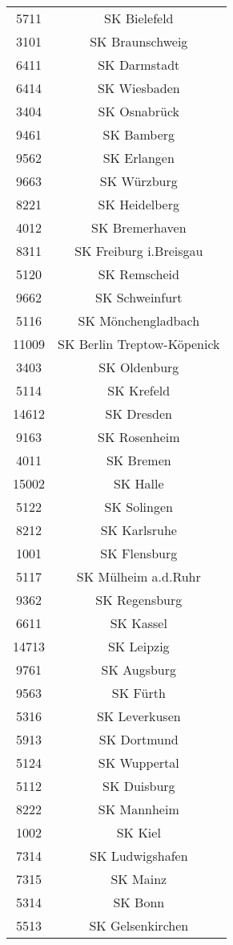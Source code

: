 \begin{tabular}{c c}
    5711&SK Bielefeld\\ 
    3101&SK Braunschweig\\ 
    6411&SK Darmstadt\\ 
    6414&SK Wiesbaden\\ 
    3404&SK Osnabrück\\ 
    9461&SK Bamberg\\ 
    9562&SK Erlangen\\ 
    9663&SK Würzburg\\ 
    8221&SK Heidelberg\\ 
    4012&SK Bremerhaven\\ 
    8311&SK Freiburg i.Breisgau\\ 
    5120&SK Remscheid\\ 
    9662&SK Schweinfurt\\ 
    5116&SK Mönchengladbach\\ 
    11009&SK Berlin Treptow-Köpenick\\ 
    3403&SK Oldenburg\\ 
    5114&SK Krefeld\\ 
    14612&SK Dresden\\ 
    9163&SK Rosenheim\\ 
    4011&SK Bremen\\ 
    15002&SK Halle\\ 
    5122&SK Solingen\\ 
    8212&SK Karlsruhe\\ 
    1001&SK Flensburg\\ 
    5117&SK Mülheim a.d.Ruhr\\ 
    9362&SK Regensburg\\ 
    6611&SK Kassel\\ 
    14713&SK Leipzig\\ 
    9761&SK Augsburg\\ 
    9563&SK Fürth\\ 
    5316&SK Leverkusen\\ 
    5913&SK Dortmund\\ 
    5124&SK Wuppertal\\ 
    5112&SK Duisburg\\ 
    8222&SK Mannheim\\ 
    1002&SK Kiel\\ 
    7314&SK Ludwigshafen\\ 
    7315&SK Mainz\\ 
    5314&SK Bonn\\ 
    5513&SK Gelsenkirchen\\ 

\end{tabular}
